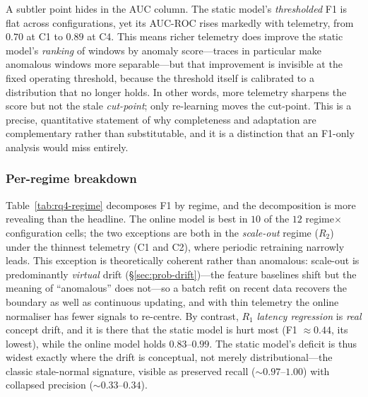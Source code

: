 \documentclass[acmsmall]{acmart}
\begin{document}
A subtler point hides in the AUC column. The static model's \emph{thresholded} F1 is flat across configurations, yet its AUC-ROC rises markedly with telemetry, from $0.70$ at C1 to $0.89$ at C4. This means richer telemetry does improve the static model's \emph{ranking} of windows by anomaly score---traces in particular make anomalous windows more separable---but that improvement is invisible at the fixed operating threshold, because the threshold itself is calibrated to a distribution that no longer holds. In other words, more telemetry sharpens the score but not the stale \emph{cut-point}; only re-learning moves the cut-point. This is a precise, quantitative statement of why completeness and adaptation are complementary rather than substitutable, and it is a distinction that an F1-only analysis would miss entirely.

\subsubsection{Per-regime breakdown}\label{sec:res-rq4-regime}

Table~\ref{tab:rq4-regime} decomposes F1 by regime, and the decomposition is more revealing than the headline. The online model is best in $10$ of the $12$ regime$\times$configuration cells; the two exceptions are both in the \emph{scale-out} regime ($R_2$) under the thinnest telemetry (C1 and C2), where periodic retraining narrowly leads. This exception is theoretically coherent rather than anomalous: scale-out is predominantly \emph{virtual} drift (\S\ref{sec:prob-drift})---the feature baselines shift but the meaning of ``anomalous'' does not---so a batch refit on recent data recovers the boundary as well as continuous updating, and with thin telemetry the online normaliser has fewer signals to re-centre. By contrast, $R_1$ \emph{latency regression} is \emph{real} concept drift, and it is there that the static model is hurt most (F1 $\approx 0.44$, its lowest), while the online model holds $0.83$--$0.99$. The static model's deficit is thus widest exactly where the drift is conceptual, not merely distributional---the classic stale-normal signature, visible as preserved recall ($\sim 0.97$--$1.00$) with collapsed precision ($\sim 0.33$--$0.34$).
\end{document}
